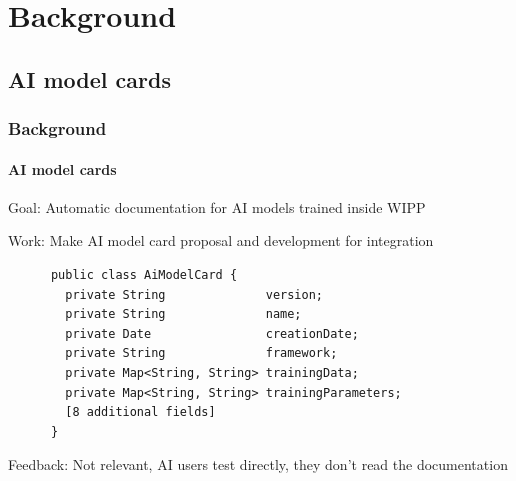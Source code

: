 \def\sectiontitle{Background}

\section{\sectiontitle}

\def\slidetitle{AI model cards}

\subsection{\slidetitle}
\begin{frame}[containsverbatim]
  \frametitle{\sectiontitle}
  \framesubtitle{\slidetitle}

  Goal: Automatic documentation for AI models trained inside WIPP

  Work: Make AI model card proposal and development for integration

  \begin{listing}[H]
    \begin{verbatim}
      public class AiModelCard {
        private String              version;
        private String              name;
        private Date                creationDate;
        private String              framework;
        private Map<String, String> trainingData;
        private Map<String, String> trainingParameters;
        [8 additional fields]
      }
    \end{verbatim}
  \end{listing}

  Feedback: Not relevant, AI users test directly, they don't read the documentation

\end{frame}

\def\slidetitle{Problem statement}

